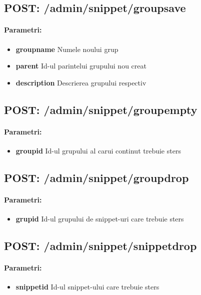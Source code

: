  \subsection*{POST: /admin/snippet/groupsave}

\paragraph{Parametri:}
\begin{itemize}
\item \textbf{groupname}
 Numele noului grup
\item \textbf{parent}
 Id-ul parintelui grupului nou creat
\item \textbf{description}
 Descrierea grupului respectiv
 \end{itemize}
 \subsection*{POST: /admin/snippet/groupempty}

\paragraph{Parametri:}
\begin{itemize}
\item \textbf{groupid}
 Id-ul grupului al carui continut trebuie sters
 \end{itemize}
 \subsection*{POST: /admin/snippet/groupdrop}

\paragraph{Parametri:}
\begin{itemize}
\item \textbf{grupid}
 Id-ul grupului de snippet-uri care trebuie sters
 \end{itemize}
 \subsection*{POST: /admin/snippet/snippetdrop}

\paragraph{Parametri:}
\begin{itemize}
\item \textbf{snippetid}
 Id-ul snippet-ului care trebuie sters
 \end{itemize}
